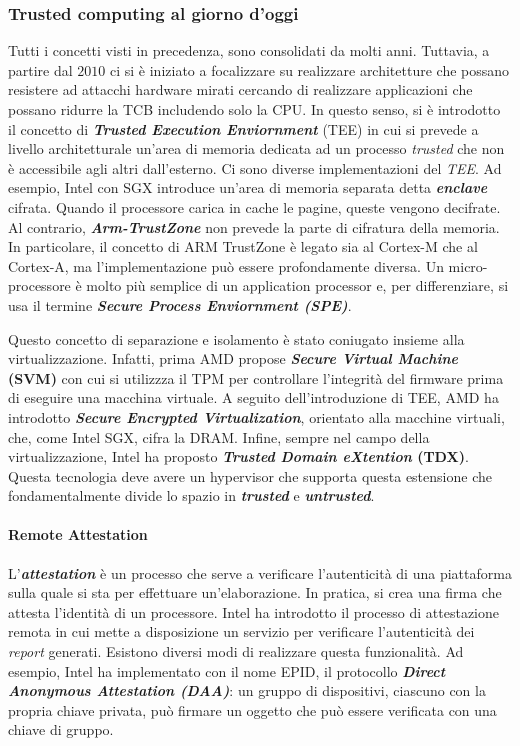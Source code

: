 \documentclass{article}
\begin{document}
\subsubsection{Trusted computing al giorno d'oggi}
Tutti i concetti visti in precedenza, sono consolidati da molti anni. Tuttavia, a partire dal $2010$ ci si è iniziato a focalizzare su realizzare architetture che possano resistere ad attacchi hardware mirati cercando di realizzare applicazioni che possano ridurre la TCB includendo solo la CPU. In questo senso, si è introdotto il concetto di \textbf{\textit{Trusted Execution Enviornment}} (TEE) in cui si prevede a livello architetturale un'area di memoria dedicata ad un processo \textit{trusted} che non è accessibile agli altri dall'esterno. Ci sono diverse implementazioni del \textit{TEE}. Ad esempio, Intel con SGX introduce un'area di memoria separata detta \textbf{\textit{enclave}} cifrata. Quando il processore carica in cache le pagine, queste vengono decifrate. Al contrario, \textbf{\textit{Arm-TrustZone}} non prevede la parte di cifratura della memoria. In particolare, il concetto di ARM TrustZone è legato sia al Cortex-M che al Cortex-A, ma l'implementazione può essere profondamente diversa. Un micro-processore è molto più semplice di un application processor e, per differenziare, si usa il termine \textbf{\textit{Secure Process Enviornment (SPE)}}.

Questo concetto di separazione e isolamento è stato coniugato insieme alla virtualizzazione. Infatti, prima AMD propose \textbf{\textit{Secure Virtual Machine} (SVM)} con cui si utilizzza il TPM per controllare l'integrità del firmware prima di eseguire una macchina virtuale. A seguito dell'introduzione di TEE, AMD ha introdotto \textbf{\textit{Secure Encrypted Virtualization}}, orientato alla macchine virtuali, che, come Intel SGX, cifra la DRAM. Infine, sempre nel campo della virtualizzazione, Intel ha proposto \textbf{\textit{Trusted Domain eXtention} (TDX)}. Questa tecnologia deve avere un hypervisor che supporta questa estensione che fondamentalmente divide lo spazio in \textbf{\textit{trusted}} e \textbf{\textit{untrusted}}.

\paragraph{Remote Attestation} L'\textbf{\textit{attestation}} è un processo che serve a verificare l'autenticità di una piattaforma sulla quale si sta per effettuare un'elaborazione. In pratica, si crea una firma che attesta l'identità di un processore. Intel ha introdotto il processo di attestazione remota in cui mette a disposizione un servizio per verificare l'autenticità dei \textit{report} generati. Esistono diversi modi di realizzare questa funzionalità. Ad esempio, Intel ha implementato con il nome EPID, il protocollo \textbf{\textit{Direct Anonymous Attestation (DAA)}}: un gruppo di dispositivi, ciascuno con la propria chiave privata, può firmare un oggetto che può essere verificata con una chiave di gruppo.
\end{document}
